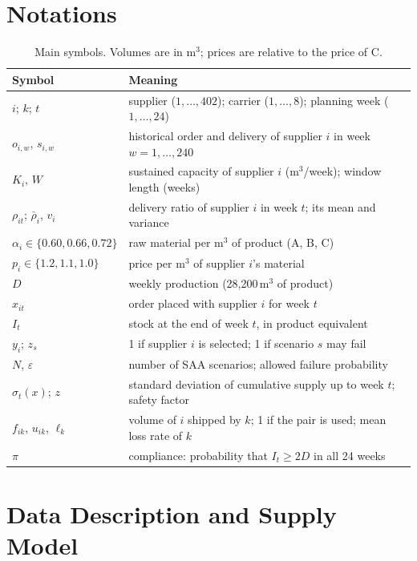 \documentclass[11pt,a4paper]{article}
\begin{document}
\section{Notations}\label{sec:notation}

\begin{table}[ht]
\centering
\caption{Main symbols. Volumes are in m$^3$; prices are relative to the price of C.}\label{tab:notation}
\small
\begin{tabular}{lp{}}
\toprule
Symbol & Meaning \\
\midrule
$i$; $k$; $t$ & supplier ($1,\dots,402$); carrier ($1,\dots,8$); planning week ($1,\dots,24$) \\
$o_{i,w}$, $s_{i,w}$ & historical order and delivery of supplier $i$ in week $w=1,\dots,240$ \\
$K_i$, $W$ & sustained capacity of supplier $i$ (m$^3$/week); window length (weeks) \\
$\rho_{it}$; $\bar\rho_i$, $v_i$ & delivery ratio of supplier $i$ in week $t$; its mean and variance \\
$\alpha_i\in\{0.60,0.66,0.72\}$ & raw material per m$^3$ of product (A, B, C) \\
$p_i\in\{1.2,1.1,1.0\}$ & price per m$^3$ of supplier $i$'s material \\
$D$ & weekly production (28{,}200\,m$^3$ of product) \\
$x_{it}$ & order placed with supplier $i$ for week $t$ \\
$I_t$ & stock at the end of week $t$, in product equivalent \\
$y_i$; $z_s$ & 1 if supplier $i$ is selected; 1 if scenario $s$ may fail \\
$N$, $\varepsilon$ & number of SAA scenarios; allowed failure probability \\
$\sigma_t(x)$; $z$ & standard deviation of cumulative supply up to week $t$; safety factor \\
$f_{ik}$, $u_{ik}$, $\ell_k$ & volume of $i$ shipped by $k$; 1 if the pair is used; mean loss rate of $k$ \\
$\pi$ & compliance: probability that $I_t\ge 2D$ in all 24 weeks \\
\bottomrule
\end{tabular}
\end{table}

\section{Data Description and Supply Model}\label{sec:model}
\end{document}

